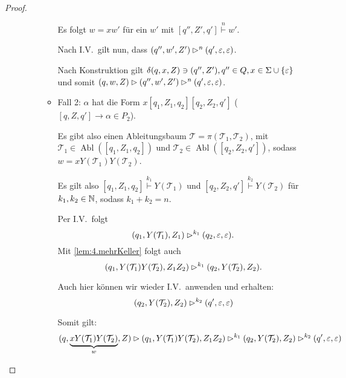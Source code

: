 \begin{proof}
\begin{itemize}
\begin{description}
\begin{itemize}
	  Es folgt $w = xw'$ für ein $w'$ mit $[q'', Z', q']\stackrel{n}{\vdash} w'$.
	  
	  Nach I.V.\ gilt nun, dass $(q'', w', Z') \rhd^n (q',\varepsilon,\varepsilon)$.
	  
	  Nach Konstruktion gilt $\delta(q, x, Z) \ni (q'', Z'), q'' \in Q, x \in \Sigma \cup \{\varepsilon\}$ und somit
	  $(q, w, Z) \rhd (q'', w', Z') \rhd^n (q',\varepsilon,\varepsilon)$.
      \item Fall 2: $\alpha$ hat die Form $x[q_1,Z_1,q_2][q_2, Z_2, q']$ ($[q,Z,q']\rightarrow\alpha \in P_2$).
      
      Es gibt also einen Ableitungsbaum $\mathcal{T} = \pi(\mathcal{T}_1,\mathcal{T}_2)$, mit $\mathcal{T}_1 \in \operatorname{Abl}([q_1, Z_1, q_2])$ und $\mathcal{T}_2 \in \operatorname{Abl}([q_2, Z_2, q'])$, sodass $w = xY(\mathcal{T}_1)Y(\mathcal{T}_2)$.
      
      Es gilt also $[q_1, Z_1, q_2]\stackrel{k_1}{\vdash} Y(\mathcal{T}_1)$ und 
      $[q_2, Z_2, q']\stackrel{k_2}{\vdash} Y(\mathcal{T}_2)$ für $k_1,k_2\in\mathbb{N}$, sodass $k_1+k_2=n$.
      
          Per I.V.\ folgt
          \begin{displaymath}
            (q_1, Y(\mathcal{T}_1), Z_1) \rhd^{k_1} (q_2, \varepsilon, \varepsilon).
          \end{displaymath}
          Mit \autoref{lem:4.mehrKeller} folgt auch
          \begin{displaymath}
            (q_1, Y(\mathcal{T}_1)Y(\mathcal{T}_2), Z_1Z_2) \rhd^{k_1} (q_2, Y(\mathcal{T}_2), Z_2).
          \end{displaymath}
          

      Auch hier können wir wieder I.V.\ anwenden und erhalten:
          \begin{displaymath}
            (q_2, Y(\mathcal{T}_2), Z_2) \rhd^{k_2} (q', \varepsilon, \varepsilon)
          \end{displaymath}
          
                    Somit gilt:
          \begin{displaymath}
            (q, \underbrace{xY(\mathcal{T}_1)Y(\mathcal{T}_2)}_{w}, Z) \rhd (q_1, Y(\mathcal{T}_1)Y(\mathcal{T}_2), Z_1Z_2) \rhd^{k_1} (q_2, Y(\mathcal{T}_2), Z_2) \rhd^{k_2} (q', \varepsilon, \varepsilon)
          \end{displaymath}
      \end{itemize}
      
     \end{description}


\end{itemize}
\end{proof}

